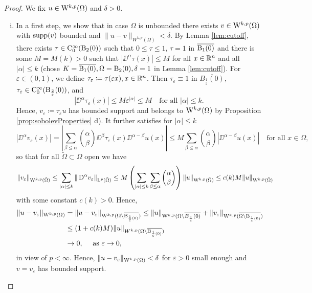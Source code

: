 \begin{proof}
  We fix $u \in \mathrm{W}^{k,p}(\Omega)$ and $\delta > 0$.
  \begin{enumerate}[i)]
    \item In a first step, we show that in case $\Omega$ is unbounded there exists $v \in \mathrm{W}^{k,p}(\Omega)$ with $\operatorname{supp}(v)$ bounded and $\|u - v\|_{W^{k,p}(\Omega)} < \delta$.
      By Lemma \ref{lem:cutoff}, there exists $\tau \in \mathrm{C}_0^\infty(\mathrm{B}_2(0))$ such that $0 \leq \tau \leq 1$, $\tau = 1$ in $\overline{\mathrm{B}_1(0)}$ and there is some $M = M(k) > 0$ such that $|\DD^\alpha \tau(x)| \leq M$ for all $x \in \mathbb{R}^n$ and all $|\alpha| \leq k$ (chose $K = \overline{\mathrm{B}_1(0)}, \Omega= \mathrm{B}_2(0), \delta = 1$ in Lemma \ref{lem:cutoff}).
      For $\varepsilon \in (0,1)$, we define $\tau_\varepsilon \coloneqq \tau(\varepsilon x), x \in \mathbb{R}^n$.
      Then $\tau_\varepsilon \equiv 1$ in $\overline{B_{\frac{1}{\varepsilon}}(0)}$, $\tau_\varepsilon \in \mathrm{C}_0^\infty(\mathrm{B}_{\frac{2}{\varepsilon}}(0))$, and
      \begin{equation}
        |\DD^\alpha \tau_\varepsilon(x)| \leq M \varepsilon^{|\alpha|} \leq M \quad\text{for all } |\alpha| \leq k.
      \end{equation}
      Hence, $v_\varepsilon \coloneqq \tau_\varepsilon u$ has bounded support and belongs to $\mathrm{W}^{k,p}(\Omega)$ by Proposition \ref{prop:sobolevProperties} d).
      It further satisfies for $|\alpha| \leq k$
      $$
      |\DD^\alpha v_\varepsilon(x)| 
      = | \sum_{\beta \leq \alpha} \binom{\alpha}{\beta} \DD^\beta \tau_\varepsilon(x) \DD^{\alpha - \beta} u(x)|
      \leq M \sum_{\beta \leq \alpha} \binom{\alpha}{\beta} | \DD^{\alpha - \beta} u(x)| \quad\text{for all } x \in\Omega,
      $$
      so that for all $\tilde\Omega \subset \Omega$ open we have
      $$
        \|v_\varepsilon\|_{\mathrm{W}^{k,p}(\tilde\Omega)}
        \leq \sum_{|\alpha|\leq k} \|\,{\operatorname{D}}^\alpha v_\varepsilon\|_{\mathrm{L}^p(\tilde\Omega)}
        \leq M \left( \sum_{|\alpha| \leq k} \sum_{\beta\leq\alpha} \binom{\alpha}{\beta} \right) \|u\|_{\mathrm{W}^{k,p}(\tilde\Omega)}
        \leq c(k) M \|u\|_{\mathrm{W}^{k,p}(\tilde\Omega)}
      $$
      with some constant $c(k) > 0$.
      Hence,
      \begin{align*}
        \|u - v_\varepsilon\|_{\mathrm{W}^{k,p}(\Omega)}
        &= \|u - v_\varepsilon\|_{\mathrm{W}^{k,p}(\Omega \setminus \overline{\mathrm{B}_{\frac{1}{\varepsilon}(0)}})}
        \leq \|u\|_{\mathrm{W}^{k,p}(\Omega \setminus \overline{B_{\frac{1}{\varepsilon}}(0)}} + \|v_\varepsilon\|_{\mathrm{W}^{k,p}(\overline{\Omega \setminus \mathrm{B}_{\frac{1}{\varepsilon}(0)}})} \\
        &\leq (1 + c(k)M) \|u\|_{W^{k,p}(\Omega \setminus \overline{\mathrm{B}_{\frac{1}{\varepsilon}(0)}})} \\
        &\to 0, \quad\text{ as } \varepsilon \to 0,
      \end{align*}
      in view of $p < \infty$.
      Hence, $\|u - v_\varepsilon\|_{\mathrm{W}^{k,p}(\Omega)} < \delta$ for $\varepsilon > 0$ small enough and $v = v_\varepsilon$ has bounded support.


\end{enumerate}
\end{proof}
